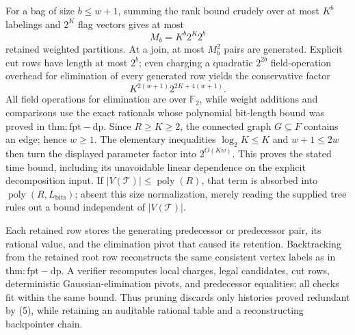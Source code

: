 For a bag of size \(b\le w+1\), summing the rank bound crudely over at most \(K^b\) labelings and \(2^K\) flag vectors gives at most
\[
 M_b=K^b2^K2^b
\]
retained weighted partitions.  At a join, at most \(M_b^2\) pairs are generated.  Explicit cut rows have length at most \(2^b\); even charging a quadratic \(2^{2b}\) field-operation overhead for elimination of every generated row yields the conservative factor
\[
 K^{2(w+1)}2^{2K+4(w+1)}.
\]
All field operations for elimination are over \(\mathbb F_2\), while weight additions and comparisons use the exact rationals whose polynomial bit-length bound was proved in \(\mathrm{thm:fpt-dp}\).  Since \(R\ge K\ge2\), the connected graph \(G\subseteq F\) contains an edge; hence \(w\ge1\).  The elementary inequalities \(\log_2K\le K\) and \(w+1\le2w\) then turn the displayed parameter factor into \(2^{O(Kw)}\).  This proves the stated time bound, including its unavoidable linear dependence on the explicit decomposition input.  If \(|V(\mathcal T)|\le\operatorname{poly}(R)\), that term is absorbed into \(\operatorname{poly}(R,L_{\mathrm{bits}})\); absent this size normalization, merely reading the supplied tree rules out a bound independent of \(|V(\mathcal T)|\).

Each retained row stores the generating predecessor or predecessor pair, its rational value, and the elimination pivot that caused its retention.  Backtracking from the retained root row reconstructs the same consistent vertex labels as in \(\mathrm{thm:fpt-dp}\).  A verifier recomputes local charges, legal candidates, cut rows, deterministic Gaussian-elimination pivots, and predecessor equalities; all checks fit within the same bound.  Thus pruning discards only histories proved redundant by (5), while retaining an auditable rational table and a reconstructing backpointer chain.

